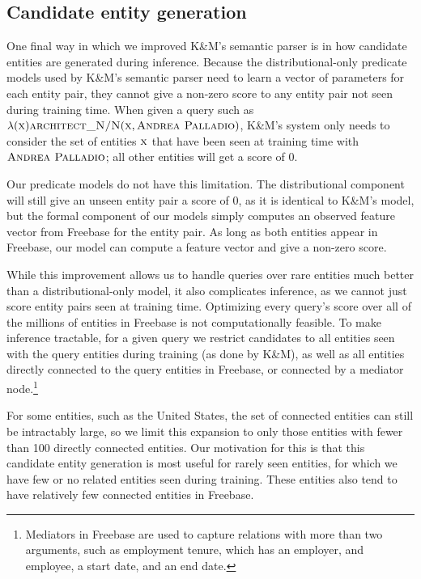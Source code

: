 \documentclass[11pt]{article}
\newcommand{\predicate}[1]{\ensuremath{\textsc{#1}}}
\newcommand{\entity}[1]{\ensuremath{\textsc{#1}}}
\begin{document}
\subsection{Candidate entity generation}
\label{sec:better-candidates}

One final way in which we improved K\&M's semantic parser is in how candidate
entities are generated during inference.  Because the distributional-only
predicate models used by K\&M's semantic parser need to learn a vector of
parameters for each entity pair, they cannot give a non-zero score to any
entity pair not seen during training time.  When given a query such as
$\lambda(\entity{x}) \predicate{architect\_N/N}(\entity{x}, \entity{Andrea
Palladio})$, K\&M's system only needs to consider the set of entities
$\entity{x}$ that have been seen at training time with \entity{Andrea
Palladio}; all other entities will get a score of 0.

Our predicate models do not have this limitation.  The distributional component
will still give an unseen entity pair a score of 0, as it is identical to K\&M's
model, but the formal component of our models simply computes an observed
feature vector from Freebase for the entity pair.  As long as both entities
appear in Freebase, our model can compute a feature vector and give a non-zero
score.

While this improvement allows us to handle queries over rare entities much
better than a distributional-only model, it also complicates inference, as we
cannot just score entity pairs seen at training time.  Optimizing every query's
score over all of the millions of entities in Freebase is not computationally
feasible.  To make inference tractable, for a given query we restrict
candidates to all entities seen with the query entities during training (as
done by K\&M), as well as all entities directly connected to the query entities
in Freebase, or connected by a mediator node.\footnote{Mediators in Freebase are
used to capture relations with more than two arguments, such as employment
tenure, which has an employer, and employee, a start date, and an end date.}

For some entities, such as the United States, the set of connected entities can
still be intractably large, so we limit this expansion to only those entities
with fewer than 100 directly connected entities.  Our motivation for this is
that this candidate entity generation is most useful for rarely seen entities,
for which we have few or no related entities seen during training.  These
entities also tend to have relatively few connected entities in Freebase.
\end{document}
